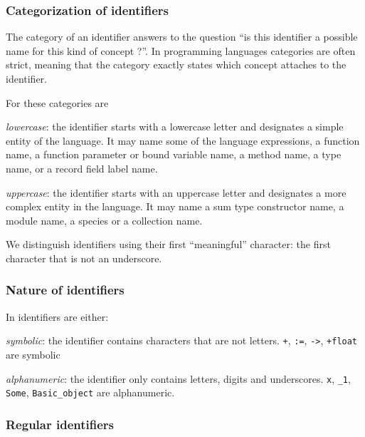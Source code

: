 \subsubsection{Categorization of identifiers}

The category of an identifier answers to the question ``is this identifier a
possible name for this kind of concept ?''.
In programming languages categories are often strict, meaning that the category
exactly states which concept attaches to the identifier.

For {\focal} these categories are
\begin{citemize}
\item {\em lowercase}: the identifier starts with a lowercase letter and
  designates a simple entity of the language. It may name some of
  the language expressions, a function name, a function parameter or bound
  variable name, a method name, a type name, or a record field label name.

\item {\em uppercase}: the identifier starts with an uppercase letter and
  designates a more complex entity in the language. It may name a sum type
  constructor name, a module name, a species or a collection name.
\end{citemize}

We distinguish identifiers using their first ``meaningful'' character:
the first character that is not an underscore.

\subsubsection{Nature of identifiers}

In {\focal} identifiers are either:

\begin{citemize}
\item {\em symbolic}: the identifier contains characters that are not
  letters. {\tt +}, {\tt :=}, {\tt ->}, {\tt +float} are symbolic

\item {\em alphanumeric}: the identifier only contains letters, digits and
  underscores. {\tt x}, {\tt \_1}, {\tt Some}, {\tt Basic\_object} are
  alphanumeric.
\end{citemize}

\subsubsection{Regular identifiers}

